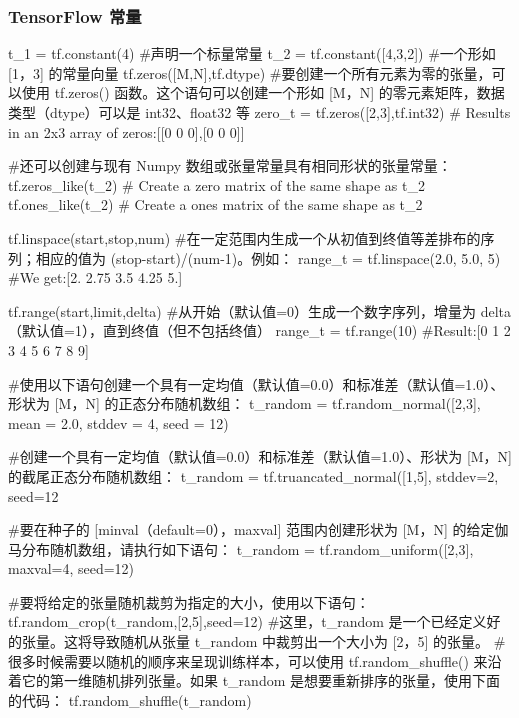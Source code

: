 \documentclass[12pt]{article}
\begin{document}
\subsubsection{TensorFlow 常量}
\begin{python}
t_1 = tf.constant(4) #声明一个标量常量
t_2 = tf.constant([4,3,2]) #一个形如 [1，3] 的常量向量
tf.zeros([M,N],tf.dtype) #要创建一个所有元素为零的张量，可以使用 tf.zeros() 函数。这个语句可以创建一个形如 [M，N] 的零元素矩阵，数据类型（dtype）可以是 int32、float32 等
zero_t = tf.zeros([2,3],tf.int32) # Results in an 2x3 array of zeros:[[0 0 0],[0 0 0]]

#还可以创建与现有 Numpy 数组或张量常量具有相同形状的张量常量：
tf.zeros_like(t_2) # Create a zero matrix of the same shape as t_2
tf.ones_like(t_2) # Create a ones matrix of the same shape as t_2

tf.linspace(start,stop,num) #在一定范围内生成一个从初值到终值等差排布的序列；相应的值为 (stop-start)/(num-1)。例如：
range_t = tf.linspace(2.0, 5.0, 5) #We get:[2. 2.75 3.5 4.25 5.]

tf.range(start,limit,delta) #从开始（默认值=0）生成一个数字序列，增量为 delta（默认值=1），直到终值（但不包括终值）
range_t = tf.range(10) #Result:[0 1 2 3 4 5 6 7 8 9]

#使用以下语句创建一个具有一定均值（默认值=0.0）和标准差（默认值=1.0）、形状为 [M，N] 的正态分布随机数组：
t_random = tf.random_normal([2,3], mean = 2.0, stddev = 4, seed = 12)

#创建一个具有一定均值（默认值=0.0）和标准差（默认值=1.0）、形状为 [M，N] 的截尾正态分布随机数组：
t_random = tf.truancated_normal([1,5], stddev=2, seed=12

#要在种子的 [minval（default=0），maxval] 范围内创建形状为 [M，N] 的给定伽马分布随机数组，请执行如下语句：
t_random = tf.random_uniform([2,3], maxval=4, seed=12)

#要将给定的张量随机裁剪为指定的大小，使用以下语句：
tf.random_crop(t_random,[2,5],seed=12) #这里，t_random 是一个已经定义好的张量。这将导致随机从张量 t_random 中裁剪出一个大小为 [2，5] 的张量。
#很多时候需要以随机的顺序来呈现训练样本，可以使用 tf.random_shuffle() 来沿着它的第一维随机排列张量。如果 t_random 是想要重新排序的张量，使用下面的代码：
tf.random_shuffle(t_random)
\end{python}
\end{document}

